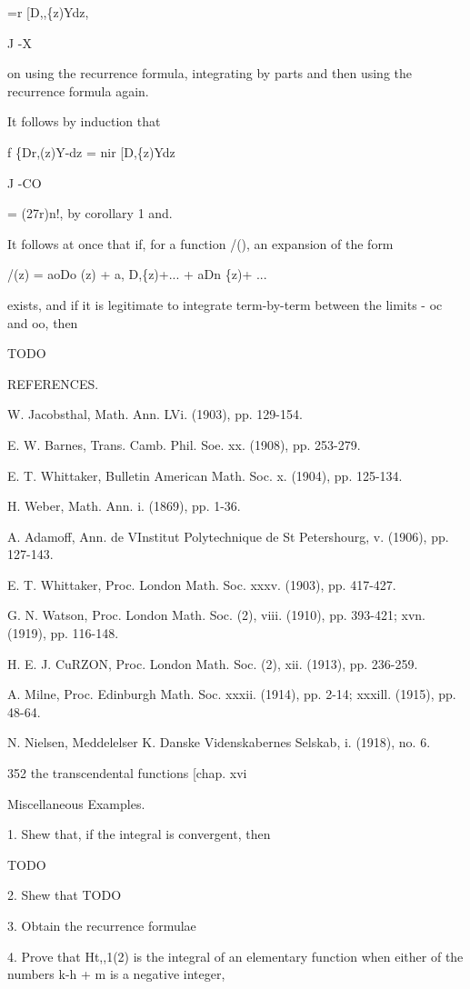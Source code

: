 =r [D,,\{z)Ydz,

J -X

on using the recurrence formula, integrating by parts and then using
the recurrence formula again.

It follows by induction that

f \{Dr,(z)Y-dz = nir [D,\{z)Ydz

J -CO

= (27r)n!, by corollary 1 and.

It follows at once that if, for a function /(), an expansion of the
form

/(z) = aoDo (z) + a, D,\{z)+... + aDn \{z)+ ...

exists, and if it is legitimate to integrate term-by-term between the
limits - oc and oo, then

TODO

REFERENCES.

W. Jacobsthal, Math. Ann. LVi. (1903), pp. 129-154.

E. W. Barnes, Trans. Camb. Phil. Soe. xx. (1908), pp. 253-279.

E. T. Whittaker, Bulletin American Math. Soc. x. (1904), pp. 125-134.

H. Weber, Math. Ann. i. (1869), pp. 1-36.

A. Adamoff, Ann. de VInstitut Polytechnique de St Petershourg, v.
(1906), pp. 127-143.

E. T. Whittaker, Proc. London Math. Soc. xxxv. (1903), pp. 417-427.

G. N. Watson, Proc. London Math. Soc. (2), viii. (1910), pp. 393-421;
xvn. (1919), pp. 116-148.

H. E. J. CuRZON, Proc. London Math. Soc. (2), xii. (1913), pp.
236-259.

A. Milne, Proc. Edinburgh Math. Soc. xxxii. (1914), pp. 2-14; xxxill.
(1915), pp. 48-64.

N. Nielsen, Meddelelser K. Danske Videnskabernes Selskab, i. (1918),
no. 6.

352 the transcendental functions [chap. xvi

Miscellaneous Examples.

1. Shew that, if the integral is convergent, then

TODO

2. Shew that TODO

3. Obtain the recurrence formulae

4. Prove that Ht,,1(2) is the integral of an elementary function when
either of the numbers k-h + m is a negative integer,

